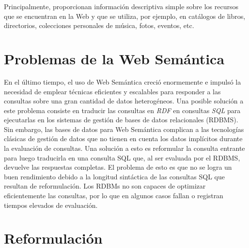 \documentclass[10pt,a4paper]{article}
\begin{document}
Principalmente, proporcionan información descriptiva simple sobre los recursos que se encuentran en la Web y que se utiliza, por ejemplo, en catálogos de libros, directorios, colecciones personales de música, fotos, eventos, etc.

\section{Problemas de la Web Semántica}
En el último tiempo, el uso de Web Semántica creció enormemente e impulsó la necesidad de emplear técnicas eficientes y escalables para responder a las consultas sobre una gran cantidad de datos heterogéneos. Una posible solución a este problema consiste en traducir las consultas en \textit{RDF} en consultas \textit{SQL} para ejecutarlas en los sistemas de gestión de bases de datos relacionales (RDBMS). Sin embargo, las bases de datos para Web Semántica complican a las tecnologías clásicas de gestión de datos que no tienen en cuenta los datos implícitos durante la evaluación de consultas. Una solución a esto es reformular la consulta entrante para luego traducirla en una consulta SQL que, al ser evaluada por el RDBMS, devuelve las respuestas completas. El problema de esto es que no se logra un buen rendimiento debido a la longitud sintáctica de las consultas SQL que resultan de reformulación. Los RDBMs no son capaces de optimizar eficientemente las consultas, por lo que en algunos casos fallan o registran tiempos elevados de evaluación.


\section{Reformulación}
\end{document}
